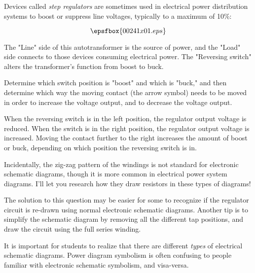 

Devices called {\it step regulators} are sometimes used in electrical power distribution systems to boost or suppress line voltages, typically to a maximum of 10\%:

$$\epsfbox{00241x01.eps}$$

The "Line" side of this autotransformer is the source of power, and the "Load" side connects to those devices consuming electrical power.  The "Reversing switch" alters the transformer's function from boost to buck.

Determine which switch position is "boost" and which is "buck," and then determine which way the moving contact (the arrow symbol) needs to be moved in order to increase the voltage output, and to decrease the voltage output.
 






When the reversing switch is in the left position, the regulator output voltage is reduced.  When the switch is in the right position, the regulator output voltage is increased.  Moving the contact further to the right increases the amount of boost or buck, depending on which position the reversing switch is in.

Incidentally, the zig-zag pattern of the windings is not standard for electronic schematic diagrams, though it is more common in electrical power system diagrams.  I'll let you research how they draw resistors in these types of diagrams!







The solution to this question may be easier for some to recognize if the regulator circuit is re-drawn using normal electronic schematic diagrams.  Another tip is to simplify the schematic diagram by removing all the different tap positions, and draw the circuit using the full series winding.

It is important for students to realize that there are different {\it types} of electrical schematic diagrams.  Power diagram symbolism is often confusing to people familiar with electronic schematic symbolism, and visa-versa.




